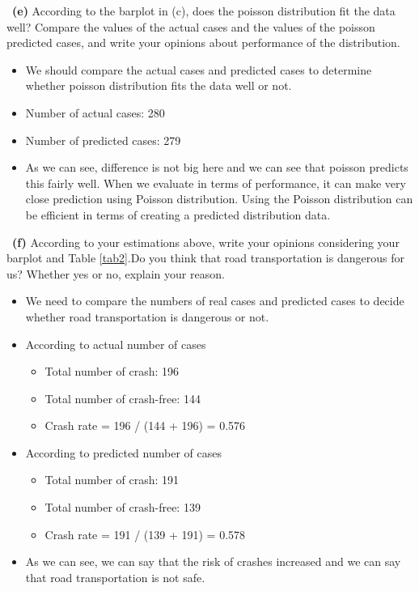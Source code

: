 \documentclass[a4 paper]{article}
\numberwithin{equation}{section}
\newcommand{\subproblem}[1]{~\newline\textbf{(#1)}}
\newcommand{\0}{\mathbf{0}}
\begin{document}
	\subproblem{e} According to the barplot in (c), does the poisson distribution fit the data well? Compare the values of the actual cases and the values of the poisson predicted cases, and write your opinions about performance of the distribution.\\
	
	\begin{itemize}
	    \item We should compare the actual cases and predicted cases to determine whether poisson distribution fits the data well or not.
	    \item Number of actual cases: 280
	    \item Number of predicted cases: 279
	    \item As we can see, difference is not big here and we can see that poisson predicts this fairly well. When we evaluate in terms of performance, it can make very close prediction using Poisson distribution. Using the Poisson distribution can be efficient in terms of creating a predicted distribution data.
	\end{itemize}
	
	\subproblem{f} According to your estimations above, write your opinions considering your barplot and Table \ref{tab2}.Do you think that road transportation is dangerous for us? Whether yes or no, explain your reason.\\
	
	\begin{itemize}
	    \item We need to compare the numbers of real cases and predicted cases to decide whether road transportation is dangerous or not.
	    \item According to actual number of cases
	        \begin{itemize}
	            \item Total number of crash: 196
	            \item Total number of crash-free: 144
	            \item Crash rate = 196 / (144 + 196) = 0.576
	        \end{itemize}
	    \item According to predicted number of cases
	        \begin{itemize}
	            \item Total number of crash: 191
	            \item Total number of crash-free: 139
	            \item Crash rate = 191 / (139 + 191) = 0.578
	        \end{itemize}
        \item As we can see, we can say that the risk of crashes increased and we can say that road transportation is not safe.
	\end{itemize}
	
\end{document}
